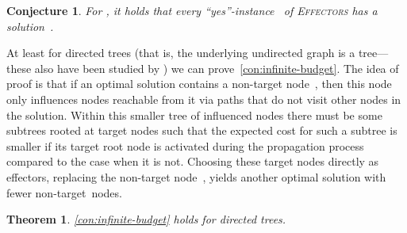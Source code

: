 \documentclass{article}
\newtheorem{theorem}{Theorem}
\newtheorem{conjecture}{Conjecture}
\newcommand{\probEffectors}{\textsc{Effectors}\xspace}
\begin{document}
\begin{conjecture}
  \label{con:infinite-budget}
  For , it holds that every ``yes''-instance~ of
  \probEffectors has a solution~.
\end{conjecture}

At least for directed trees
(that is, the underlying undirected graph is a tree---these also have
been studied by \citet{LTGMH10}) 
we can prove~\autoref{con:infinite-budget}.
The idea of proof is that if an optimal solution contains a non-target
node~, then this node only influences nodes reachable from it via paths that do not visit other nodes in the solution. Within this smaller tree of influenced nodes there must be some subtrees rooted at target nodes such that the expected cost for such a subtree is smaller if its target root node is activated during the propagation process compared to the case when it is not. Choosing these target nodes directly as effectors, replacing the non-target node~, yields another optimal solution with fewer non-target~nodes.

\begin{theorem}\label{thm:conjectureForTrees}
  \autoref{con:infinite-budget} holds for directed trees.
\end{theorem}
\end{document}
